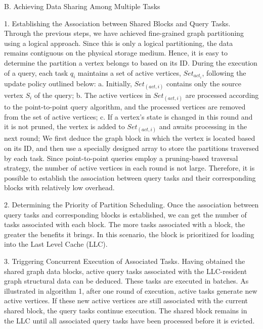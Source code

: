\documentclass[lettersize,journal]{IEEEtran} %
\begin{document}
B. Achieving Data Sharing Among Multiple Tasks

1. Establishing the Association between Shared Blocks and Query Tasks. Through the previous steps, we have achieved fine-grained graph partitioning using a logical approach. Since this is only a logical partitioning, the data remains contiguous on the physical storage medium. Hence, it is easy to determine the partition a vertex belongs to based on its ID. During the execution of a query, each task $q_i$ maintains a set of active vertices, $Set_{act_i}$, following the update policy outlined below:
a. Initially, $Set_(act,i)$ contains only the source vertex $S_i$ of the query;
b. The active vertices in $Set_(act,i)$ are processed according to the point-to-point query algorithm, and the processed vertices are removed from the set of active vertices;
c. If a vertex's state is changed in this round and it is not pruned, the vertex is added to $Set_(act,i)$ and awaits processing in the next round;
We first deduce the graph block in which the vertex is located based on its ID, and then use a specially designed array to store the partitions traversed by each task. Since point-to-point queries employ a pruning-based traversal strategy, the number of active vertices in each round is not large. Therefore, it is possible to establish the association between query tasks and their corresponding blocks with relatively low overhead.

2. Determining the Priority of Partition Scheduling. Once the association between query tasks and corresponding blocks is established, we can get the number of tasks associated with each block. The more tasks associated with a block, the greater the benefits it brings. In this scenario, the block is prioritized for loading into the Last Level Cache (LLC).

3. Triggering Concurrent Execution of Associated Tasks. Having obtained the shared graph data blocks, active query tasks associated with the LLC-resident graph structural data can be deduced. These tasks are executed in batches. As illustrated in algorithm 1, after one round of execution, active tasks generate new active vertices. If these new active vertices are still associated with the current shared block, the query tasks continue execution. The shared block remains in the LLC until all associated query tasks have been processed before it is evicted.
\end{document}
